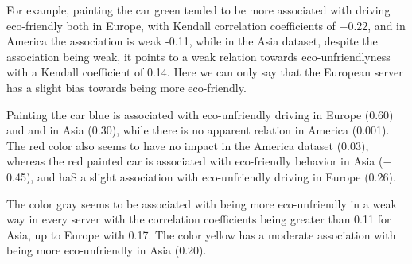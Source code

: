 \documentclass[preprint,authoryear,12pt]{elsarticle}
\begin{document}

For example, painting the car green tended to be more associated with driving eco-friendly both in Europe, with Kendall correlation coefficients of $-$0.22, and in America the association is weak -0.11, while in the Asia dataset, despite the association being weak, it points to a weak relation towards eco-unfriendlyness with a Kendall coefficient of 0.14. Here we can only say that the European server has a slight bias towards being more eco-friendly. 

Painting the car blue is associated with eco-unfriendly driving in Europe (0.60) and and in Asia (0.30), while there is no apparent relation in America (0.001).
The red color also seems to have no impact in the America dataset (0.03), whereas the red painted car is associated with eco-friendly behavior in Asia ($-$0.45), and haS a slight association with eco-unfriendly driving in Europe (0.26).

The color gray seems to be associated with being more eco-unfriendly in a weak way in every server with the correlation coefficients being greater than 0.11 for Asia, up to Europe with 0.17. The color yellow has a moderate association with being more eco-unfriendly in Asia (0.20).

%


\end{document}

